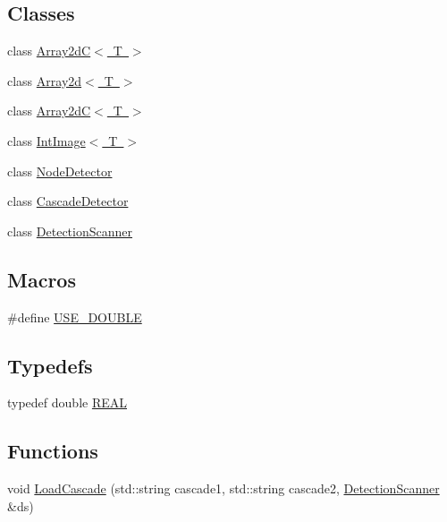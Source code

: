 \subsection*{Classes}
\begin{DoxyCompactItemize}
\item 
class \mbox{\hyperlink{class_array2d_c}{Array2d\+C$<$ T $>$}}
\item 
class \mbox{\hyperlink{class_array2d}{Array2d$<$ T $>$}}
\item 
class \mbox{\hyperlink{class_array2d_c}{Array2d\+C$<$ T $>$}}
\item 
class \mbox{\hyperlink{class_int_image}{Int\+Image$<$ T $>$}}
\item 
class \mbox{\hyperlink{class_node_detector}{Node\+Detector}}
\item 
class \mbox{\hyperlink{class_cascade_detector}{Cascade\+Detector}}
\item 
class \mbox{\hyperlink{class_detection_scanner}{Detection\+Scanner}}
\end{DoxyCompactItemize}
\subsection*{Macros}
\begin{DoxyCompactItemize}
\item 
\#define \mbox{\hyperlink{c4-pedestrian-detector_8h_a3602f95fb57ccdebbb4e06786d23d033}{U\+S\+E\+\_\+\+D\+O\+U\+B\+LE}}
\end{DoxyCompactItemize}
\subsection*{Typedefs}
\begin{DoxyCompactItemize}
\item 
typedef double \mbox{\hyperlink{c4-pedestrian-detector_8h_a5821460e95a0800cf9f24c38915cbbde}{R\+E\+AL}}
\end{DoxyCompactItemize}
\subsection*{Functions}
\begin{DoxyCompactItemize}
\item 
void \mbox{\hyperlink{c4-pedestrian-detector_8h_a1c2c730891bb9a5800d3761e8cfaa160}{Load\+Cascade}} (std\+::string cascade1, std\+::string cascade2, \mbox{\hyperlink{class_detection_scanner}{Detection\+Scanner}} \&ds)
\end{DoxyCompactItemize}


